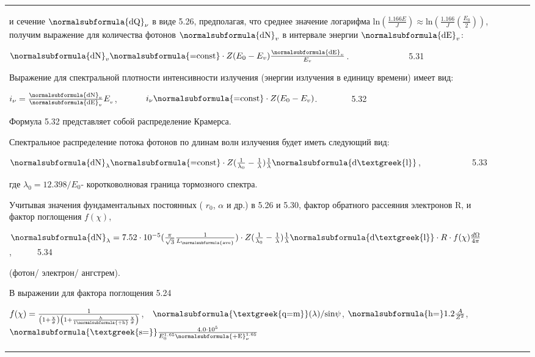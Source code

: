 \documentclass[a4paper,14pt, openany, twoside, draft]{extbook} %
\begin{document}
\begin{flushleft}
\begin{supertabular}{|m{1.7279999cm}|m{1.522cm}|m{1.522cm}|m{1.522cm}|m{1.744cm}|}
и сечение  $\normalsubformula{\text{dQ}}_{\nu }$ в виде 5.26, предполагая, что среднее значение логарифма  $\text{ln}(\frac{1.166E} J)\approx \text{ln}(\frac{1.166} J(\frac{E_0} 2))$, получим выражение для количества фотонов  $\normalsubformula{\text{dN}}_v$ в интервале энергии  $\normalsubformula{\text{dE}}_v$:

 $\normalsubformula{\text{dN}}_v\normalsubformula{\text{=const}}\cdot Z(E_0-E_v)\frac{\normalsubformula{\text{dE}}_v}{E_v}$.\ \ \ \ \ \ \ \ \ \ \ \ \ \ 5.31

Выражение для спектральной плотности интенсивности излучения (энергии излучения в единицу времени) имеет вид:

 $i_{\nu }=\frac{\normalsubformula{\text{dN}}_v}{\normalsubformula{\text{dE}}_v}E_{_v}$, \ \ \ \ \ \  $i_{\nu }\normalsubformula{\text{=const}}\cdot Z(E_0-E_v)$.\ \ \ \ \ \ \ \ 5.32

Формула 5.32 представляет собой распределение Крамерса.

Спектральное распределение потока фотонов по длинам волн излучения будет иметь следующий вид:

 $\normalsubformula{\text{dN}}_{\lambda }\normalsubformula{\text{=const}}\cdot Z(\frac 1{\lambda _0}-\frac 1{\lambda })\frac 1{\lambda }\normalsubformula{\text{d\textgreek{l}}}$,\ \ \ \ \ \ \ \ \ \ \ \ 5.33

где  $\lambda _0=12.398/E_0${}- коротковолновая граница тормозного спектра.

Учитывая значения фундаментальных постоянных ( $r_0$, ${\alpha}$ и др.) в 5.26 и 5.30, фактор обратного рассеяния электронов R, и фактор поглощения $f(\chi )$,

 $\normalsubformula{\text{dN}}_{\lambda }=7.52\cdot 10^{-5}(\frac{\pi }{\sqrt 3}\frac 1{L_{\normalsubformula{\text{ave}}}})\cdot Z(\frac 1{\lambda _0}-\frac 1{\lambda })\frac 1{\lambda }\normalsubformula{\text{d\textgreek{l}}}\cdot R\cdot f(\chi )\frac{d\Omega }{4\pi }$,\ \ \ \ \ \ 5.34

(фотон/ электрон/ ангстрем).

В выражении для фактора поглощения 5.24

 $f(\chi )=\frac 1{\left(1+\frac{\chi }{\sigma }\right)\left(1+\frac h{1\normalsubformula{\text{+h}}}\frac{\chi }{\sigma }\right)}$,\ \  $\normalsubformula{\text{\textgreek{q=m}}}(\lambda )\text{/sin}\psi $,   $\normalsubformula{\text{h=}}1.2\frac A{Z^2}$,   $\normalsubformula{\text{\textgreek{s=}}}\frac{4.0\cdot 10^5}{E_0^{1.65}\normalsubformula{\text{+E}}_{\nu }^{1.65}}$


\end{supertabular}
\end{flushleft}
\end{document}
